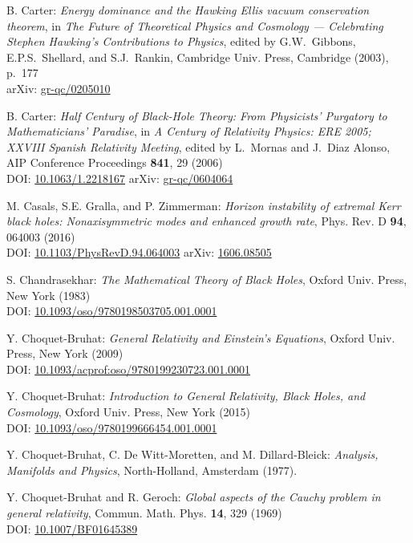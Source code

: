 \begin{thebibliography}{123}
B. Carter: {\em Energy dominance and the Hawking Ellis vacuum conservation theorem},
in {\em The Future of Theoretical Physics and Cosmology ---
Celebrating Stephen Hawking's Contributions to Physics}, edited by G.W.~Gibbons, E.P.S.~Shellard,
and S.J.~Rankin,
Cambridge Univ. Press, Cambridge (2003), p.~177\\
arXiv: \href{https://arxiv.org/abs/gr-qc/0205010}{gr-qc/0205010}

B. Carter:
{\em Half Century of Black‐Hole Theory: From Physicists' Purgatory to Mathematicians' Paradise},
in {\em A Century of Relativity Physics: ERE 2005; XXVIII Spanish Relativity Meeting},
edited by L.~Mornas and J.~Diaz Alonso,
AIP Conference Proceedings {\bf 841}, 29 (2006)\\
DOI: \href{https://doi.org/10.1063/1.2218167}{10.1063/1.2218167}\hfill
arXiv: \href{https://arxiv.org/abs/gr-qc/0604064}{gr-qc/0604064}

M. Casals, S.E. Gralla, and P. Zimmerman:
{\em Horizon instability of extremal Kerr black holes: Nonaxisymmetric modes and enhanced growth rate},
Phys. Rev. D {\bf 94}, 064003 (2016)\\
DOI: \href{https://doi.org/10.1103/PhysRevD.94.064003}{10.1103/PhysRevD.94.064003}\hfill
arXiv: \href{https://arxiv.org/abs/1606.08505}{1606.08505}

S. Chandrasekhar: {\em The Mathematical Theory of Black Holes},
Oxford Univ. Press, New York (1983)\\
DOI: \href{https://doi.org/10.1093/oso/9780198503705.001.0001}{10.1093/oso/9780198503705.001.0001}

Y. Choquet-Bruhat: {\em General Relativity and Einstein's Equations},
Oxford Univ. Press, New York (2009)\\
DOI: \href{https://doi.org/10.1093/acprof:oso/9780199230723.001.0001}{10.1093/acprof:oso/9780199230723.001.0001}

Y. Choquet-Bruhat: {\em Introduction to General Relativity, Black Holes, and
Cosmology}, Oxford Univ. Press, New York (2015)\\
DOI: \href{https://doi.org/10.1093/oso/9780199666454.001.0001}{10.1093/oso/9780199666454.001.0001}

Y. Choquet-Bruhat, C. De Witt-Moretten, and M. Dillard-Bleick:
{\em Analysis, Manifolds and Physics},
North-Holland, Amsterdam (1977).

Y. Choquet-Bruhat and R. Geroch:
{\em Global aspects of the Cauchy problem in general relativity},
Commun. Math. Phys. {\bf 14}, 329 (1969)\\
DOI: \href{https://doi.org/10.1007/BF01645389}{10.1007/BF01645389}


\end{thebibliography}
